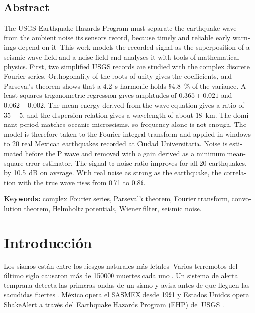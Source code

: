 \documentclass[11pt,letterpaper]{article}
\begin{document}
\begin{otherlanguage}{english}
\section*{Abstract}
The USGS Earthquake Hazards Program must separate the earthquake wave from the ambient noise its sensors record, because timely and reliable early warnings depend on it. This work models the recorded signal as the superposition of a seismic wave field and a noise field and analyzes it with tools of mathematical physics. First, two simplified USGS records are studied with the complex discrete Fourier series. Orthogonality of the roots of unity gives the coefficients, and Parseval's theorem shows that a \SI{4.2}{s} harmonic holds \SI{94.8}{\percent} of the variance. A least-squares trigonometric regression gives amplitudes of $0.365 \pm 0.021$ and $0.062 \pm 0.002$. The mean energy derived from the wave equation gives a ratio of $35 \pm 5$, and the dispersion relation gives a wavelength of about \SI{18}{km}. The dominant period matches oceanic microseisms, so frequency alone is not enough. The model is therefore taken to the Fourier integral transform and applied in windows to 20 real Mexican earthquakes recorded at Ciudad Universitaria. Noise is estimated before the P wave and removed with a gain derived as a minimum mean-square-error estimator. The signal-to-noise ratio improves for all 20 earthquakes, by \SI{10.5}{dB} on average. With real noise as strong as the earthquake, the correlation with the true wave rises from 0.71 to 0.86.

\textbf{Keywords:} complex Fourier series, Parseval's theorem, Fourier transform, convolution theorem, Helmholtz potentials, Wiener filter, seismic noise.
\end{otherlanguage}

\clearpage
\tableofcontents
\clearpage

\section{Introducción}
Los sismos están entre los riesgos naturales más letales. Varios terremotos del último siglo causaron más de \num{150000} muertes cada uno \parencite{statista2025}. Un sistema de alerta temprana detecta las primeras ondas de un sismo y avisa antes de que lleguen las sacudidas fuertes \parencite{allen2019}. México opera el SASMEX desde 1991 \parencite{espinosa1995} y Estados Unidos opera ShakeAlert a través del Earthquake Hazards Program (EHP) del USGS \parencite{usgs_ehp,usgs_anss}.
\end{document}
